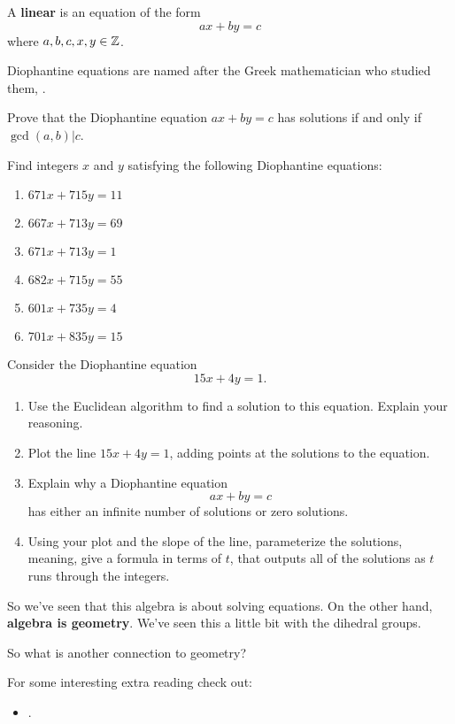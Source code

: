 \documentclass{ximera}
\begin{document}
\begin{definition}
  A \textbf{linear}  is an equation of the
  form
  \[
  ax + by = c
  \]
  where $a,b,c,x,y\in\mathbb Z$.
\end{definition}

Diophantine equations are named after the Greek mathematician who
studied them, .

\begin{exercise}
  Prove that the Diophantine equation $ax + by = c$ has solutions if
  and only if $\gcd(a,b)|c$.
\end{exercise}

\begin{exercise}
  Find integers $x$ and $y$ satisfying the following Diophantine
  equations:
  \begin{enumerate}
  \item $671x + 715 y = 11$ 
  \item $667x + 713 y = 69$ 
  \item $671x + 713 y = 1$
  \item $682x + 715 y = 55$
  \item $601x + 735 y = 4$
  \item $701x + 835 y = 15$
  \end{enumerate}
\end{exercise}

\begin{exercise}
  Consider the Diophantine equation
  \[
  15x + 4y = 1.
  \]
  \begin{enumerate}
  \item Use the Euclidean algorithm to find a solution to this
    equation. Explain your reasoning.
  \item Plot the line $15x + 4y = 1$, adding points at the solutions
    to the equation.
  \item Explain why a Diophantine equation 
    \[
    ax + by = c
    \]
  has either an infinite number of solutions or zero solutions.
\item Using your plot and the slope of the line, parameterize the
  solutions, meaning, give a formula in terms of $t$, that outputs all
  of the solutions as $t$ runs through the integers.
  \end{enumerate}
\end{exercise}


So we've seen that this algebra is about solving equations. On the
other hand, \textbf{algebra is geometry}. We've seen this a little bit
with the dihedral groups.


\begin{question}
  So what is another connection to geometry?
\end{question}


For some interesting extra reading check out:
\begin{itemize}
\item {}.
\end{itemize}
\end{document}

